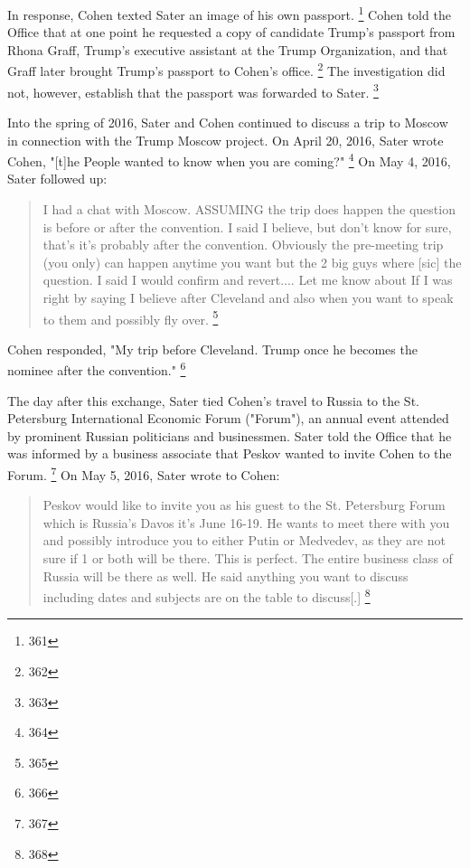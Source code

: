 In response, Cohen texted Sater an image of his own passport.%
\footnote{361}
Cohen told the Office that at one point he requested a copy of candidate Trump's passport from Rhona Graff, Trump's executive assistant at the Trump Organization, and that Graff later brought Trump's passport to Cohen's office.%
\footnote{362}
The investigation did not, however, establish that the passport was forwarded to Sater.%
\footnote{363}

Into the spring of 2016, Sater and Cohen continued to discuss a trip to Moscow in connection with the Trump Moscow project.
On April 20, 2016, Sater wrote Cohen, "[t]he People wanted to know when you are coming?"%
\footnote{364}
On May 4, 2016, Sater followed up:

\begin{quote}
I had a chat with Moscow.
ASSUMING the trip does happen the question is before or after the convention.
I said I believe, but don't know for sure, that's it's probably after the convention.
Obviously the pre-meeting trip (you only) can happen anytime you want but the 2 big guys where [sic] the question.
I said I would confirm and revert....
Let me know about If I was right by saying I believe after Cleveland and also when you want to speak to them and possibly fly over.%
\footnote{365}
\end{quote}

Cohen responded, "My trip before Cleveland.
Trump once he becomes the nominee after the convention."%
\footnote{366}

The day after this exchange, Sater tied Cohen's travel to Russia to the St. Petersburg International Economic Forum ("Forum"), an annual event attended by prominent Russian politicians and businessmen.
Sater told the Office that he was informed by a business associate that Peskov wanted to invite Cohen to the Forum.%
\footnote{367}
On May 5, 2016, Sater wrote to Cohen:

\begin{quote}
Peskov would like to invite you as his guest to the St. Petersburg Forum which is Russia's Davos it's June 16-19.
He wants to meet there with you and possibly introduce you to either Putin or Medvedev, as they are not sure if 1 or both will be there.
This is perfect.
The entire business class of Russia will be there as well.
He said anything you want to discuss including dates and subjects are on the table to discuss[.]%
\footnote{368}
\end{quote}

